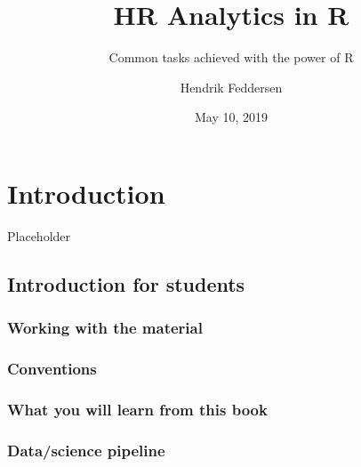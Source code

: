 \documentclass[12pt, krantz2,]{krantz}
\title{HR Analytics in R}
\subtitle{Common tasks achieved with the power of R}
\author{Hendrik Feddersen}
\date{May 10, 2019}
\begin{document}
\maketitle


\thispagestyle{empty}

\begin{center}
\end{center}

\setlength{\abovedisplayskip}{-5pt}
\setlength{\abovedisplayshortskip}{-5pt}

{
\hypersetup{linkcolor=}
\setcounter{tocdepth}{2}
\tableofcontents
}
\listoftables
\listoffigures
\hypertarget{intro}{%
\chapter{Introduction}\label{intro}}

Placeholder

\hypertarget{sec:intro-for-students}{%
\section{Introduction for students}\label{sec:intro-for-students}}

\hypertarget{workingwithmaterials}{%
\subsection*{Working with the material}\label{workingwithmaterials}}


\hypertarget{conventions}{%
\subsection*{Conventions}\label{conventions}}


\hypertarget{subsec:learning-goals}{%
\subsection{What you will learn from this book}\label{subsec:learning-goals}}

\hypertarget{subsec:pipeline}{%
\subsection{Data/science pipeline}\label{subsec:pipeline}}
\end{document}
